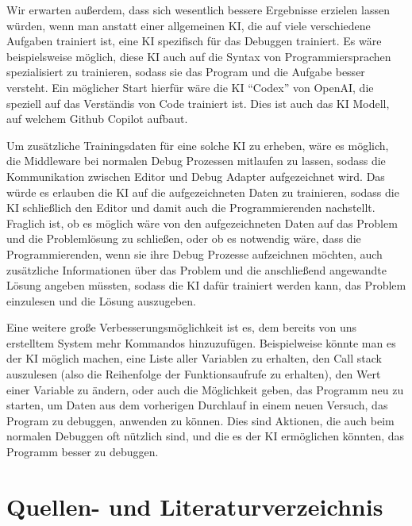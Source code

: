 \documentclass[a4paper,12pt,ngerman]{scrartcl}
\begin{document}
Wir erwarten außerdem, dass sich wesentlich bessere Ergebnisse erzielen lassen würden, wenn man anstatt einer allgemeinen KI, die auf viele verschiedene Aufgaben trainiert ist, eine KI spezifisch für das Debuggen trainiert. Es wäre beispielsweise möglich, diese KI auch auf die Syntax von Programmiersprachen spezialisiert zu trainieren, sodass sie das Program und die Aufgabe besser versteht. Ein möglicher Start hierfür wäre die KI ``Codex'' von OpenAI, die speziell auf das Verständis von Code trainiert ist. Dies ist auch das KI Modell, auf welchem Github Copilot aufbaut.

Um zusätzliche Trainingsdaten für eine solche KI zu erheben, wäre es möglich, die Middleware bei normalen Debug Prozessen mitlaufen zu lassen, sodass die Kommunikation zwischen Editor und Debug Adapter aufgezeichnet wird. Das würde es erlauben die KI auf die aufgezeichneten Daten zu trainieren, sodass die KI schließlich den Editor und damit auch die Programmierenden nachstellt. Fraglich ist, ob es möglich wäre von den aufgezeichneten Daten auf das Problem und die Problemlösung zu schließen, oder ob es notwendig wäre, dass die Programmierenden, wenn sie ihre Debug Prozesse aufzeichnen möchten, auch zusätzliche Informationen über das Problem und die anschließend angewandte Lösung angeben müssten, sodass die KI dafür trainiert werden kann, das Problem einzulesen und die Lösung auszugeben.

Eine weitere große Verbesserungsmöglichkeit ist es, dem bereits von uns erstelltem System mehr Kommandos hinzuzufügen. Beispielweise könnte man es der KI möglich machen, eine Liste aller Variablen zu erhalten, den Call stack auszulesen (also die Reihenfolge der Funktionsaufrufe zu erhalten), den Wert einer Variable zu ändern, oder auch die Möglichkeit geben, das Programm neu zu starten, um Daten aus dem vorherigen Durchlauf in einem neuen Versuch, das Program zu debuggen, anwenden zu können. Dies sind Aktionen, die auch beim normalen Debuggen oft nützlich sind, und die es der KI ermöglichen könnten, das Programm besser zu debuggen.

\section{Quellen- und Literaturverzeichnis}
\end{document}
